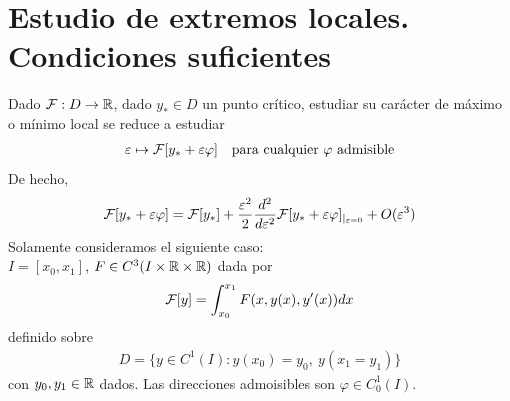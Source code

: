\chapter{Estudio de extremos locales. Condiciones suficientes}

Dado $\mathcal{F}:D \to \mathbb{R}$, dado $y_*\in D$ un punto crítico, estudiar su carácter de máximo o mínimo local se reduce a estudiar
\begin{gather*}
    \varepsilon \mapsto \mathcal{F}[y_* + \varepsilon \varphi] \ \ \text{ para cualquier $\varphi$ admisible}
\end{gather*}
De hecho, 
\begin{gather*}
    \mathcal{F}[y_*+\varepsilon\varphi] = \mathcal{F}[y_*] + \frac{\varepsilon^2}{2} \frac{d^2}{d\varepsilon^2} \mathcal{F}[y_* + \varepsilon\varphi]_{|_{\varepsilon = 0}} + O(\varepsilon^3)
\end{gather*}
Solamente consideramos el siguiente caso:\\

$I=[x_0, x_1]$, $F\in C^3(I \times \mathbb{R} \times \mathbb{R})$ dada por 
\begin{gather*}
    \mathcal{F}[y] = \int_{x_0}^{x_1} F(x, y(x), y'(x)) dx
\end{gather*}
definido sobre
\begin{gather*}
    D = \{y\in C^1(I) : y(x_0)=y_0,\ y(x_1=y_1)\}
\end{gather*}
con $y_0,y_1\in \mathbb{R}$ dados. Las direcciones admoisibles son $\varphi\in C_0^1(I)$.\\

